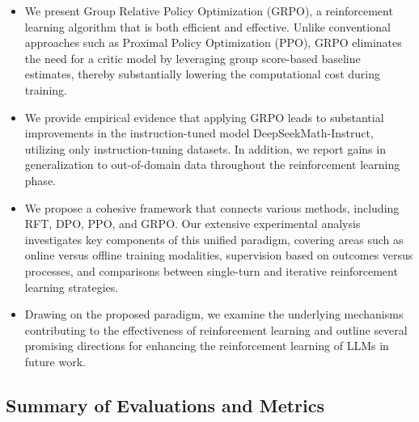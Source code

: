 \begin{itemize}[topsep=0pt]
    \item We present Group Relative Policy Optimization (GRPO), a reinforcement learning algorithm that is both efficient and effective. Unlike conventional approaches such as Proximal Policy Optimization (PPO), GRPO eliminates the need for a critic model by leveraging group score-based baseline estimates, thereby substantially lowering the computational cost during training.
    \item We provide empirical evidence that applying GRPO leads to substantial improvements in the instruction-tuned model DeepSeekMath-Instruct, utilizing only instruction-tuning datasets. In addition, we report gains in generalization to out-of-domain data throughout the reinforcement learning phase.
    \item We propose a cohesive framework that connects various methods, including RFT, DPO, PPO, and GRPO. Our extensive experimental analysis investigates key components of this unified paradigm, covering areas such as online versus offline training modalities, supervision based on outcomes versus processes, and comparisons between single-turn and iterative reinforcement learning strategies.
    \item Drawing on the proposed paradigm, we examine the underlying mechanisms contributing to the effectiveness of reinforcement learning and outline several promising directions for enhancing the reinforcement learning of LLMs in future work.
\end{itemize}

\subsection{Summary of Evaluations and Metrics}

